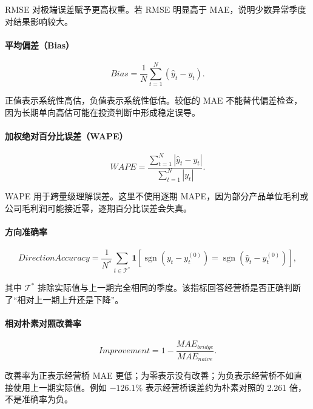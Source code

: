 \documentclass[11pt,a4paper]{ctexart}
\begin{document}
RMSE 对极端误差赋予更高权重。若 RMSE 明显高于 MAE，说明少数异常季度对结果影响较大。

\paragraph{平均偏差（Bias）}

\begin{equation*}
Bias=\frac{1}{N}\sum_{t=1}^{N}\left(\widehat{y}_t-y_t\right).
\end{equation*}

正值表示系统性高估，负值表示系统性低估。较低的 MAE 不能替代偏差检查，因为长期单向高估可能在投资判断中形成稳定误导。

\paragraph{加权绝对百分比误差（WAPE）}

\begin{equation*}
WAPE=\frac{\sum_{t=1}^{N}\left|\widehat{y}_t-y_t\right|}
{\sum_{t=1}^{N}\left|y_t\right|}.
\end{equation*}

WAPE 用于跨量级理解误差。这里不使用逐期 MAPE，因为部分产品单位毛利或公司毛利润可能接近零，逐期百分比误差会失真。

\paragraph{方向准确率}

\begin{equation*}
DirectionAccuracy=
\frac{1}{N^*}\sum_{t\in\mathcal{T}^*}
\mathbf{1}\left[
\operatorname{sgn}(y_t-y_t^{(0)})
=\operatorname{sgn}(\widehat{y}_t-y_t^{(0)})
\right],
\end{equation*}

其中 $\mathcal{T}^*$ 排除实际值与上一期完全相同的季度。该指标回答经营桥是否正确判断了“相对上一期上升还是下降”。

\paragraph{相对朴素对照改善率}

\begin{equation*}
Improvement=1-\frac{MAE_{bridge}}{MAE_{naive}}.
\end{equation*}

改善率为正表示经营桥 MAE 更低；为零表示没有改善；为负表示经营桥不如直接使用上一期实际值。例如 $-126.1\%$ 表示经营桥误差约为朴素对照的 2.261 倍，不是准确率为负。
\end{document}

